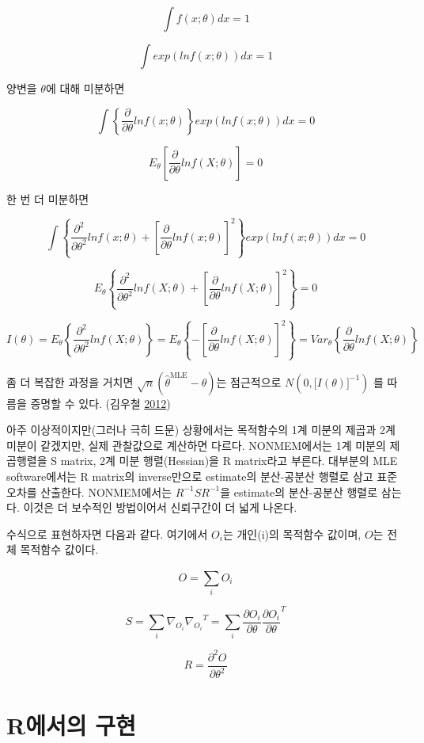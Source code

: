 \documentclass[
  10pt,
]{krantz}
\begin{document}
\[\int f(x;\theta)dx = 1\]

\[\int exp(lnf(x;\theta))dx = 1\]

양변을 \(\theta\)에 대해 미분하면

\[\int\left\{ \frac{\partial}{\partial\theta}lnf(x;\theta) \right\} exp(lnf(x;\theta))dx = 0\]

\[E_{\theta}\left\lbrack \frac{\partial}{\partial\theta}lnf(X;\theta) \right\rbrack = 0\]

한 번 더 미분하면

\[\int\left\{ \frac{\partial^{2}}{\partial\theta^{2}}lnf(x;\theta) + \left\lbrack \frac{\partial}{\partial\theta}lnf(x;\theta) \right\rbrack^{2} \right\} exp(lnf(x;\theta))dx = 0\]

\[E_{\theta}\left\{ \frac{\partial^{2}}{\partial\theta^{2}}lnf(X;\theta) + \left\lbrack \frac{\partial}{\partial\theta}lnf(X;\theta) \right\rbrack^{2} \right\} = 0\]

\[I(\theta) = E_{\theta}\left\{ \frac{\partial^{2}}{\partial\theta^{2}}lnf(X;\theta) \right\} = E_{\theta}\left\{ - \left\lbrack \frac{\partial}{\partial\theta}lnf(X;\theta) \right\rbrack^{2} \right\} = Var_{\theta}\left\{ \frac{\partial}{\partial\theta}lnf(X;\theta) \right\}\]

좀 더 복잡한 과정을 거치면 \(\sqrt{n}({\widehat{\theta}}^{\text{MLE}} - \theta)\)는
점근적으로 \(N(0,\lbrack I(\theta)\rbrack^{- 1})\) 를 따름을 증명할 수 있다. (김우철 \protect\hyperlink{ref-kim}{2012})

아주 이상적이지만(그러나 극히 드문) 상황에서는 목적함수의 1계 미분의 제곱과 2계 미분이 같겠지만, 실제 관찰값으로 계산하면
다르다. NONMEM에서는 1계 미분의 제곱행렬을 S matrix, 2계 미분 행렬(Hessian)을 R matrix라고
부른다. 대부분의 MLE software에서는 R matrix의 inverse만으로 estimate의 분산-공분산 행렬로 삼고
표준오차를 산출한다. NONMEM에서는 \(R^{- 1}SR^{- 1}\)을 estimate의 분산-공분산 행렬로 삼는다. 이것은
더 보수적인 방법이어서 신뢰구간이 더 넓게 나온다.

수식으로 표현하자면 다음과 같다. 여기에서 \(O_{i}\)는 개인(i)의 목적함수 값이며, \(O\)는 전체 목적함수 값이다.

\[O = \sum_{i}^{}O_{i}\]

\[S = \sum_{i}^{}{\nabla_{O_{i}}{\nabla_{O_{i}}}^{T}} = \sum_{i}^{}\frac{\partial O_{i}}{\partial\theta}\frac{\partial O_{i}}{\partial\theta}^{T}\]

\[R = \frac{\partial^{2}O}{\partial\theta^{2}}\]

\hypertarget{ruxc5d0uxc11cuxc758-uxad6cuxd604}{%
\section{R에서의 구현}\label{ruxc5d0uxc11cuxc758-uxad6cuxd604}}
\end{document}
